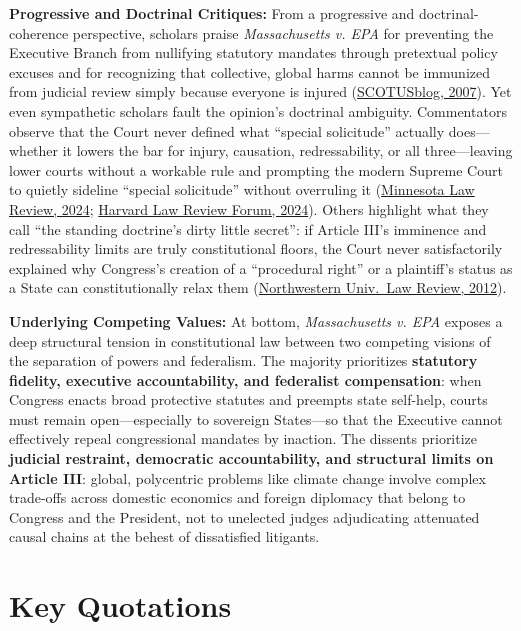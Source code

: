 \documentclass[12pt]{article}
\begin{document}
\textbf{Progressive and Doctrinal Critiques:} From a progressive and doctrinal-coherence perspective, scholars praise \textit{Massachusetts v. EPA} for preventing the Executive Branch from nullifying statutory mandates through pretextual policy excuses and for recognizing that collective, global harms cannot be immunized from judicial review simply because everyone is injured (\href{https://www.scotusblog.com/2007/04/discussion-board-thoughts-on-mass-v-epa/}{SCOTUSblog, 2007}). Yet even sympathetic scholars fault the opinion's doctrinal ambiguity. Commentators observe that the Court never defined what ``special solicitude'' actually does---whether it lowers the bar for injury, causation, redressability, or all three---leaving lower courts without a workable rule and prompting the modern Supreme Court to quietly sideline ``special solicitude'' without overruling it (\href{https://scholarship.law.umn.edu/cgi/viewcontent.cgi?article=1011&context=minnlrev}{Minnesota Law Review, 2024}; \href{https://harvardlawreview.org/forum/vol-137/what-happened-to-traceability/}{Harvard Law Review Forum, 2024}). Others highlight what they call ``the standing doctrine's dirty little secret'': if Article III's imminence and redressability limits are truly constitutional floors, the Court never satisfactorily explained why Congress's creation of a ``procedural right'' or a plaintiff's status as a State can constitutionally relax them (\href{https://scholarlycommons.law.northwestern.edu/cgi/viewcontent.cgi?article=1084&context=nulr}{Northwestern Univ.\ Law Review, 2012}).

\textbf{Underlying Competing Values:} At bottom, \textit{Massachusetts v. EPA} exposes a deep structural tension in constitutional law between two competing visions of the separation of powers and federalism. The majority prioritizes \textbf{statutory fidelity, executive accountability, and federalist compensation}: when Congress enacts broad protective statutes and preempts state self-help, courts must remain open---especially to sovereign States---so that the Executive cannot effectively repeal congressional mandates by inaction. The dissents prioritize \textbf{judicial restraint, democratic accountability, and structural limits on Article III}: global, polycentric problems like climate change involve complex trade-offs across domestic economics and foreign diplomacy that belong to Congress and the President, not to unelected judges adjudicating attenuated causal chains at the behest of dissatisfied litigants.

\section{Key Quotations}
\end{document}

